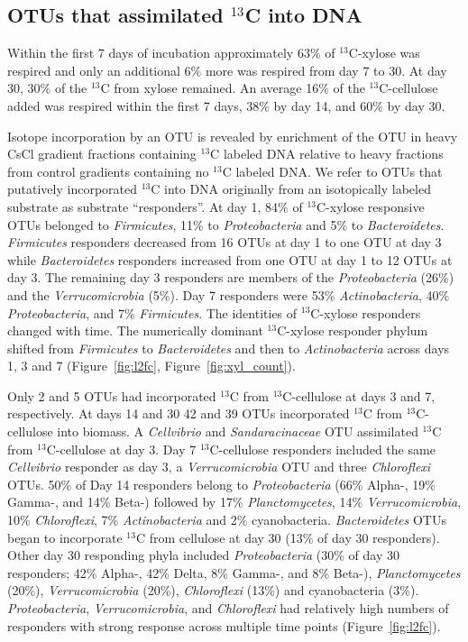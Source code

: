 \subsection{OTUs that assimilated $^{13}$C into DNA} \label{responders}
Within the first 7 days of incubation approximately 63\% of $^{13}$C-xylose was
respired and only an additional 6\% more was respired from day 7 to 30. At day
30, 30\% of the $^{13}$C from xylose remained. An average 16\% of the
$^{13}$C-cellulose added was respired within the first 7 days, 38\% by day 14,
and 60\% by day 30.   

Isotope incorporation by an OTU is revealed by enrichment of the OTU in heavy
CsCl gradient fractions containing $^{13}$C labeled DNA relative to heavy
fractions from control gradients containing no $^{13}$C labeled DNA. We refer
to OTUs that putatively incorporated $^{13}$C into DNA originally from an
isotopically labeled substrate as  substrate ``responders''. At day 1, 84\% of
$^{13}$C-xylose responsive OTUs belonged to \textit{Firmicutes}, 11\% to
\textit{Proteobacteria} and 5\% to \textit{Bacteroidetes}. \textit{Firmicutes}
responders decreased from 16 OTUs at day 1 to one OTU at day 3 while
\textit{Bacteroidetes} responders increased from one OTU at day 1 to 12 OTUs at
day 3. The remaining day 3 responders are members of the
\textit{Proteobacteria} (26\%) and the \textit{Verrucomicrobia} (5\%). Day
7 responders were 53\% \textit{Actinobacteria}, 40\% \textit{Proteobacteria},
and 7\% \textit{Firmicutes}. The identities of $^{13}$C-xylose responders
changed with time. The numerically dominant $^{13}$C-xylose responder phylum
shifted from \textit{Firmicutes} to \textit{Bacteroidetes} and then to
\textit{Actinobacteria} across days 1, 3 and 7 (Figure~\ref{fig:l2fc},
Figure~\ref{fig:xyl_count}). 

Only 2 and 5 OTUs had incorporated $^{13}$C from
$^{13}$C-cellulose at days 3 and 7, respectively. At days 14 and 30
42 and 39 OTUs incorporated $^{13}$C from $^{13}$C-cellulose into
biomass. A \textit{Cellvibrio} and \textit{Sandaracinaceae} OTU assimilated
$^{13}$C from $^{13}$C-cellulose at day 3. Day 7 $^{13}$C-cellulose responders
included the same \textit{Cellvibrio} responder as day 3,
a \textit{Verrucomicrobia} OTU and three \textit{Chloroflexi} OTUs.  50\% of
Day 14 responders belong to \textit{Proteobacteria} (66\% Alpha-, 19\% Gamma-,
and 14\% Beta-) followed by 17\% \textit{Planctomycetes}, 14\%
\textit{Verrucomicrobia}, 10\% \textit{Chloroflexi}, 7\%
\textit{Actinobacteria} and 2\% cyanobacteria. \textit{Bacteroidetes} OTUs
began to incorporate $^{13}$C from cellulose at day
30 (13\% of day 30 responders). Other day 30 responding phyla included
\textit{Proteobacteria} (30\% of day 30 responders; 42\% Alpha-, 42\% Delta,
8\% Gamma-, and 8\% Beta-), \textit{Planctomycetes} (20\%),
\textit{Verrucomicrobia} (20\%), \textit{Chloroflexi} (13\%) and
cyanobacteria (3\%). \textit{Proteobacteria}, \textit{Verrucomicrobia}, and
\textit{Chloroflexi} had relatively high numbers of responders with strong
response across multiple time points (Figure~\ref{fig:l2fc}).

